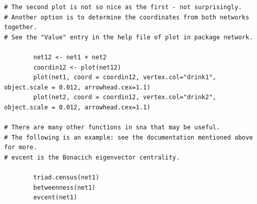 \documentclass[a4paper,fleqn]{article}
\newcommand{\+}{\, + \,}
\begin{document}
{\begin{verbatim}
# The second plot is not so nice as the first - not surprisingly.
# Another option is to determine the coordinates from both networks together.
# See the "Value" entry in the help file of plot in package network.

        net12 <- net1 + net2
        coordin12 <- plot(net12)
        plot(net1, coord = coordin12, vertex.col="drink1", object.scale = 0.012, arrowhead.cex=1.1)
        plot(net2, coord = coordin12, vertex.col="drink2", object.scale = 0.012, arrowhead.cex=1.1)

# There are many other functions in sna that may be useful.
# The following is an example: see the documentation mentioned above for more.
# evcent is the Bonacich eigenvector centrality.

        triad.census(net1)
        betweenness(net1)
        evcent(net1)
\end{verbatim}

}
\end{document}

